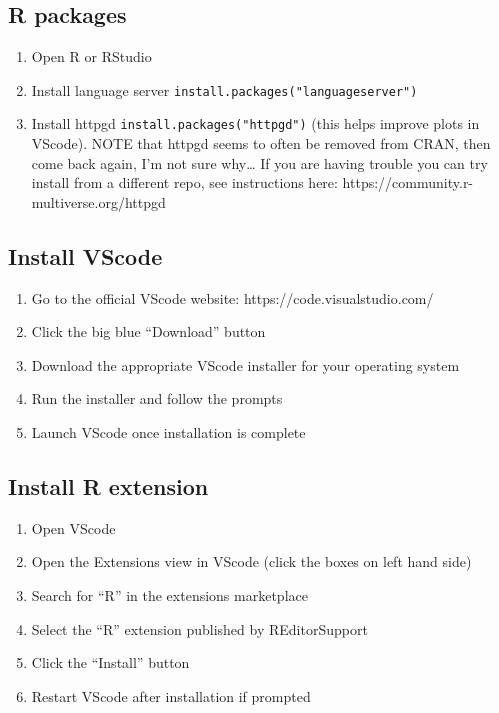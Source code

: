 \documentclass[
  letterpaper,
  DIV=11,
  numbers=noendperiod]{scrreprt}
\providecommand{\tightlist}{%
  \setlength{\itemsep}{0pt}\setlength{\parskip}{0pt}}
\begin{document}
\subsection{R packages}\label{r-packages-1}

\begin{enumerate}
\def\labelenumi{\arabic{enumi}.}
\tightlist
\item
  Open R or RStudio
\item
  Install language server \texttt{install.packages("languageserver")}
\item
  Install httpgd \texttt{install.packages("httpgd")} (this helps improve
  plots in VScode). NOTE that httpgd seems to often be removed from
  CRAN, then come back again, I'm not sure why\ldots{} If you are having
  trouble you can try install from a different repo, see instructions
  here: https://community.r-multiverse.org/httpgd
\end{enumerate}

\subsection{Install VScode}\label{install-vscode}

\begin{enumerate}
\def\labelenumi{\arabic{enumi}.}
\tightlist
\item
  Go to the official VScode website: https://code.visualstudio.com/
\item
  Click the big blue ``Download'' button
\item
  Download the appropriate VScode installer for your operating system
\item
  Run the installer and follow the prompts
\item
  Launch VScode once installation is complete
\end{enumerate}

\subsection{Install R extension}\label{install-r-extension}

\begin{enumerate}
\def\labelenumi{\arabic{enumi}.}
\tightlist
\item
  Open VScode
\item
  Open the Extensions view in VScode (click the boxes on left hand side)
\item
  Search for ``R'' in the extensions marketplace
\item
  Select the ``R'' extension published by REditorSupport
\item
  Click the ``Install'' button
\item
  Restart VScode after installation if prompted
\end{enumerate}
\end{document}
